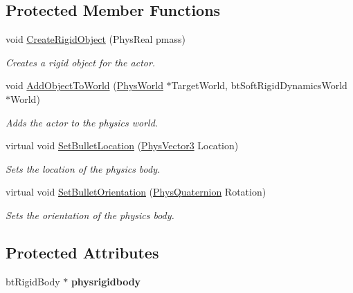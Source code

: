\subsection*{Protected Member Functions}
\begin{DoxyCompactItemize}
\item 
void \hyperlink{classActorDynRigid_a93052967ae8e6bebb810a5303ebc2a48}{CreateRigidObject} (PhysReal pmass)
\begin{DoxyCompactList}\small\item\em Creates a rigid object for the actor. \item\end{DoxyCompactList}\item 
void \hyperlink{classActorDynRigid_a45c054918362b86d829398384e316ed8}{AddObjectToWorld} (\hyperlink{classPhysWorld}{PhysWorld} $\ast$TargetWorld, btSoftRigidDynamicsWorld $\ast$World)
\begin{DoxyCompactList}\small\item\em Adds the actor to the physics world. \item\end{DoxyCompactList}\item 
virtual void \hyperlink{classActorDynRigid_a3f0720ca18d04a1084207d474c3d7834}{SetBulletLocation} (\hyperlink{classPhysVector3}{PhysVector3} Location)
\begin{DoxyCompactList}\small\item\em Sets the location of the physics body. \item\end{DoxyCompactList}\item 
virtual void \hyperlink{classActorDynRigid_ae471894081ae956dd79844a2f14fb1d9}{SetBulletOrientation} (\hyperlink{classPhysQuaternion}{PhysQuaternion} Rotation)
\begin{DoxyCompactList}\small\item\em Sets the orientation of the physics body. \item\end{DoxyCompactList}\end{DoxyCompactItemize}
\subsection*{Protected Attributes}
\begin{DoxyCompactItemize}
\item 
\hypertarget{classActorDynRigid_a83a6cb758304431043c6bfa05b47ecb2}{
btRigidBody $\ast$ {\bfseries physrigidbody}}
\label{d4/d0e/classActorDynRigid_a83a6cb758304431043c6bfa05b47ecb2}

\end{DoxyCompactItemize}


